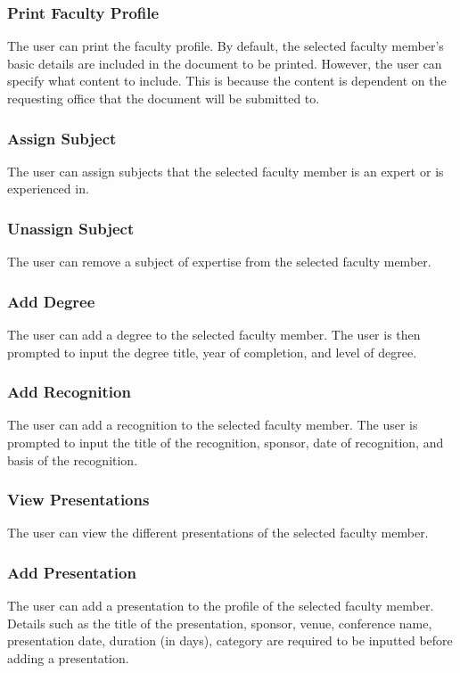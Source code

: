     	\subsubsection{Print Faculty Profile}
    	The user can print the faculty profile. By default, the selected faculty member's basic details are included in the document to be printed. However, the user can specify what content to include. This is because the content is dependent on the requesting office that the document will be submitted to.
    	
    	\subsubsection{Assign Subject}
    	The user can assign subjects that the selected faculty member is an expert or is experienced in.
    	
    	\subsubsection{Unassign Subject}
    	The user can remove a subject of expertise from the selected faculty member.
    	
    	\subsubsection{Add Degree}
    	The user can add a degree to the selected faculty member. The user is then prompted to input the degree title, year of completion, and level of degree.
    	
    	\subsubsection{Add Recognition}
    	The user can add a recognition to the selected faculty member. The user is prompted to input the title of the recognition, sponsor, date of recognition, and basis of the recognition.
    	
    	\subsubsection{View Presentations}
    	The user can view the different presentations of the selected faculty member.
    	
    	\subsubsection{Add Presentation}
    	The user can add a presentation to the profile of the selected faculty member. Details such as the title of the presentation, sponsor, venue, conference name, presentation date, duration (in days), category are required to be inputted before adding a presentation.
    	
